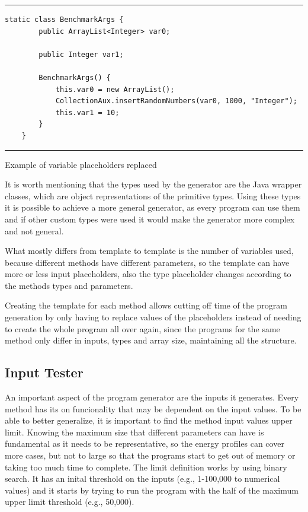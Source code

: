 \begin{listing}[htbp]
\noindent\rule{\linewidth}{0.4pt}
\begin{verbatim}
static class BenchmarkArgs {
        public ArrayList<Integer> var0;

        public Integer var1;

        BenchmarkArgs() {
            this.var0 = new ArrayList();
            CollectionAux.insertRandomNumbers(var0, 1000, "Integer");
            this.var1 = 10;
        }
    }
\end{verbatim}
\noindent\rule{\linewidth}{0.4pt}
\caption{Example of variable placeholders replaced}            
\label{lst:var_placeholders_replaced}
\end{listing}



It is worth mentioning that the types used by the generator are the Java wrapper classes, which are object representations of the primitive types. Using these types it is possible to achieve a more general generator, as every program can use them and if other custom types were used it would make the generator more complex and not general.

What mostly differs from template to template is the number of variables used, because different methods have different parameters, so the template can have more or less input placeholders, also the type placeholder changes according to the methods types and parameters.


Creating the template for each method allows cutting off time of the program generation by only having to replace values of the placeholders instead of needing to create the whole program all over again, since the programs for the same method only differ in inputs, types and array size, maintaining all the structure.

\subsection{Input Tester} \label{sec:work_stage1_input_tester}

An important aspect of the program generator are the inputs it generates. Every method has its on funcionality that may be dependent on the input values.  To be able to better generalize, it is important to find the method input values upper limit. Knowing the maximum size that different parameters can have is fundamental as it needs to be representative, so the energy profiles can cover more cases, but not to large so that the programs start to get out of memory or taking too much time to complete.
The limit definition works by using binary search. It has an inital threshold on the inputs (e.g., 1-100,000 to numerical values) and it starts by trying to run the program with the half of the maximum upper limit threshold (e.g., 50,000). 

